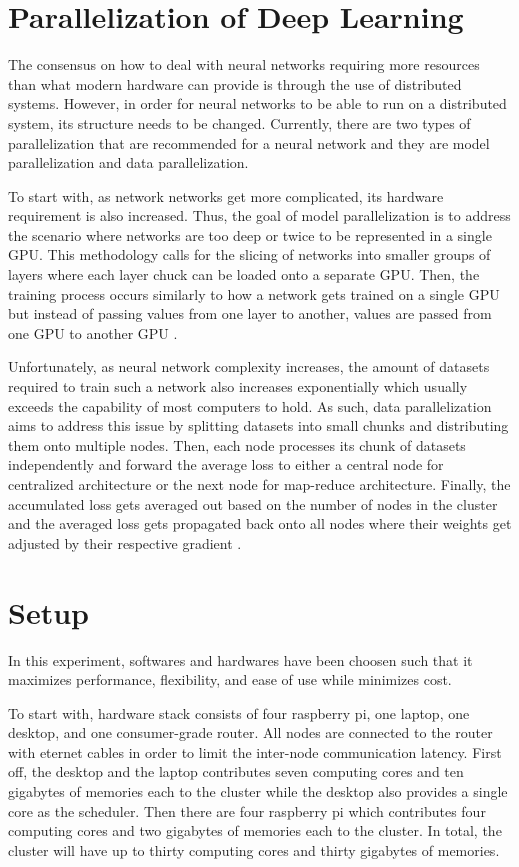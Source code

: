 \documentclass{IEEEtran}
\begin{document}
    \section{Parallelization of Deep Learning}
        The consensus on how to deal with neural networks requiring more resources than what modern hardware can provide is through the use of distributed systems. However, in order for neural networks to be able to run on a distributed system, its structure needs to be changed. Currently, there are two types of parallelization that are recommended for a neural network and they are model parallelization and data parallelization.

        To start with, as network networks get more complicated, its hardware requirement is also increased. Thus, the goal of model parallelization is to address the scenario where networks are too deep or twice to be represented in a single GPU. This methodology calls for the slicing of networks into smaller groups of layers where each layer chuck can be loaded onto a separate GPU. Then, the training process occurs similarly to how a network gets trained on a single GPU but instead of passing values from one layer to another, values are passed from one GPU to another GPU \cite{ben-nun_hoefler_2019}.

        Unfortunately, as neural network complexity increases, the amount of datasets required to train such a network also increases exponentially which usually exceeds the capability of most computers to hold. As such, data parallelization aims to address this issue by splitting datasets into small chunks and distributing them onto multiple nodes. Then, each node processes its chunk of datasets independently and forward the average loss to either a central node for centralized architecture or the next node for map-reduce architecture. Finally, the accumulated loss gets averaged out based on the number of nodes in the cluster and the averaged loss gets propagated back onto all nodes where their weights get adjusted by their respective gradient \cite{ben-nun_hoefler_2019}.

    \section{Setup}
        In this experiment, softwares and hardwares have been choosen such that it maximizes performance, flexibility, and ease of use while minimizes cost. 
        
        To start with, hardware stack consists of four raspberry pi, one laptop, one desktop, and one consumer-grade router. All nodes are connected to the router with eternet cables in order to limit the inter-node communication latency. First off, the desktop and the laptop contributes seven computing cores and ten gigabytes of memories each to the cluster while the desktop also provides a single core as the scheduler. Then there are four raspberry pi which contributes four computing cores and two gigabytes of memories each to the cluster. In total, the cluster will have up to thirty computing cores and thirty gigabytes of memories.
\end{document}
